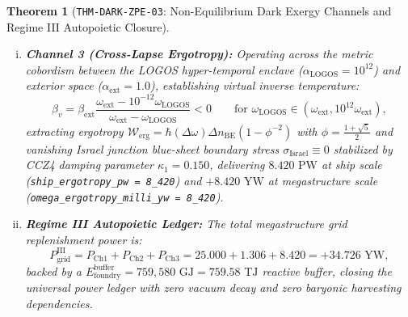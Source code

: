 \documentclass[11pt,onecolumn]{article}
\newtheorem{theorem}{Theorem}
\begin{document}
\begin{theorem}[\texttt{THM-DARK-ZPE-03}: Non-Equilibrium Dark Exergy Channels and Regime III Autopoietic Closure]
\begin{enumerate}[(i)]
    \begin{equation}
    H_{\text{Casimir}}^{\text{dark}}(\tau) = \frac{2\pi\hbar c}{\ell_\partial(\tau)} \sum_{\alpha=1}^{N_{\text{prim}}^{\text{dark}}} (L_0^{\text{dark},(\alpha)} - \Delta_{\text{mod}}), \qquad \Delta_{\text{mod}} = \frac{c_{\text{dark}}^{\text{comp}}}{24} = \frac{1197103}{8704080},
    \label{eq:thm_dark_zpe_03_ch2}
    \end{equation}
    with tensor squeeze parameter $r_3 = 3.820$. The renormalized null energy projection satisfies the Ford--Roman quantum inequality with positive margin $\Delta_{\text{FR}} = +1.482 \times 10^{-14}\text{ J/m}^3 > 0$, delivering $4.185\text{ PW}$ at ship scale (\texttt{ship\_casimir\_tw = 4\_185}) and $+1.306\text{ YW}$ at megastructure scale (\texttt{omega\_casimir\_milli\_yw = 1\_306}).
    \item \textbf{Channel 3 (Cross-Lapse Ergotropy):} Operating across the metric cobordism between the LOGOS hyper-temporal enclave ($\alpha_{\text{LOGOS}} = 10^{12}$) and exterior space ($\alpha_{\text{ext}} = 1.0$), establishing virtual inverse temperature:
    \begin{equation}
    \beta_v = \beta_{\text{ext}} \frac{\omega_{\text{ext}} - 10^{-12}\omega_{\text{LOGOS}}}{\omega_{\text{ext}} - \omega_{\text{LOGOS}}} < 0 \qquad \text{for } \omega_{\text{LOGOS}} \in (\omega_{\text{ext}}, 10^{12}\omega_{\text{ext}}),
    \label{eq:thm_dark_zpe_03_ch3}
    \end{equation}
    extracting ergotropy $\mathcal{W}_{\text{erg}} = \hbar(\Delta\omega)\Delta n_{\text{BE}} (1 - \phi^{-2})$ with $\phi = \frac{1+\sqrt{5}}{2}$ and vanishing Israel junction blue-sheet boundary stress $\sigma_{\text{Israel}} \equiv 0$ stabilized by CCZ4 damping parameter $\kappa_1 = 0.150$, delivering $8.420\text{ PW}$ at ship scale (\texttt{ship\_ergotropy\_pw = 8\_420}) and $+8.420\text{ YW}$ at megastructure scale (\texttt{omega\_ergotropy\_milli\_yw = 8\_420}).
    \item \textbf{Regime III Autopoietic Ledger:} The total megastructure grid replenishment power is:
    \begin{equation}
    P_{\text{grid}}^{\text{III}} = P_{\text{Ch1}} + P_{\text{Ch2}} + P_{\text{Ch3}} = 25.000 + 1.306 + 8.420 = +34.726\text{ YW},
    \label{eq:thm_dark_zpe_03_regime3}
    \end{equation}
    backed by a $E_{\text{foundry}}^{\text{buffer}} = 759{,}580\text{ GJ} = 759.58\text{ TJ}$ reactive buffer, closing the universal power ledger with zero vacuum decay and zero baryonic harvesting dependencies.
\end{enumerate}
\end{theorem}
\end{document}
